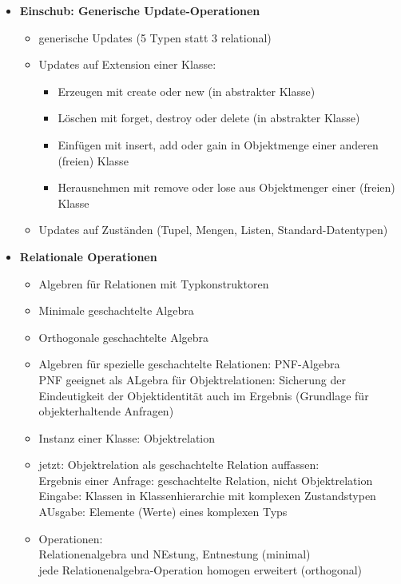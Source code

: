 \begin{itemize}
	\item \textbf{Einschub: Generische Update-Operationen}
	\begin{itemize}
		\item generische Updates (5 Typen statt 3 relational)
		\item Updates auf Extension einer Klasse:
		\begin{itemize}
			\item Erzeugen mit create oder new (in abstrakter Klasse)
			\item Löschen mit forget, destroy oder delete (in abstrakter Klasse)
			\item Einfügen mit insert, add oder gain in Objektmenge einer anderen (freien) Klasse
			\item Herausnehmen mit remove oder lose aus Objektmenger einer (freien) Klasse
		\end{itemize}
		\item Updates auf Zuständen (Tupel, Mengen, Listen, Standard-Datentypen)
	\end{itemize}
	
	\item \textbf{Relationale Operationen}
	\begin{itemize}
		\item Algebren für Relationen mit Typkonstruktoren
		\item Minimale geschachtelte Algebra
		\item Orthogonale geschachtelte Algebra
		\item Algebren für spezielle geschachtelte Relationen: PNF-Algebra\\
		PNF geeignet als ALgebra für Objektrelationen: Sicherung der Eindeutigkeit der Objektidentität auch im Ergebnis (Grundlage für objekterhaltende Anfragen)
		\item Instanz einer Klasse: Objektrelation
		\item jetzt: Objektrelation als geschachtelte Relation auffassen:\\
		Ergebnis einer Anfrage: geschachtelte Relation, nicht Objektrelation\\
		Eingabe: Klassen in Klassenhierarchie mit komplexen Zustandstypen\\
		AUsgabe: Elemente (Werte) eines komplexen Typs
		\item Operationen:\\
		Relationenalgebra und NEstung, Entnestung (minimal)\\
		jede Relationenalgebra-Operation homogen erweitert (orthogonal)
	\end{itemize}
	

\end{itemize}
